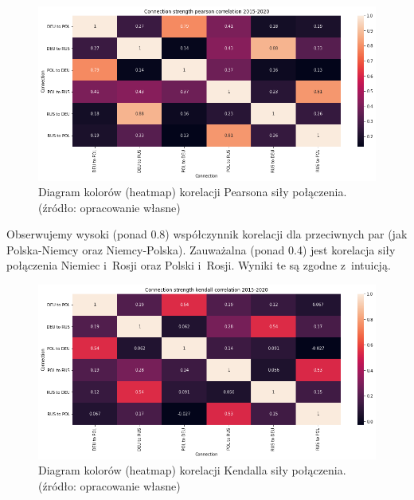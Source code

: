\documentclass[11pt]{report}
\begin{document}
    \begin{figure}[!ht]
        \centering
        \includegraphics[width=\linewidth]{../spade_proto/figures/correlation/Connection strength pearson correlation 2015-2020.png}
        \caption{Diagram kolorów (heatmap) korelacji Pearsona siły połączenia. (źródło: opracowanie własne)}
        \label{fig:Connection strength pearson correlation 2015-2020}
    \end{figure}

    Obserwujemy wysoki (ponad 0.8) współczynnik korelacji dla przeciwnych par (jak Polska-Niemcy oraz Niemcy-Polska).
    Zauważalna (ponad 0.4) jest korelacja siły połączenia Niemiec i~Rosji oraz Polski i~Rosji.
    Wyniki te są zgodne z~intuicją.

    \begin{figure}[!ht]
        \centering
        \includegraphics[width=\linewidth]{../spade_proto/figures/correlation/Connection strength kendall correlation 2015-2020.png}
        \caption{Diagram kolorów (heatmap) korelacji Kendalla siły połączenia. (źródło: opracowanie własne)}
        \label{fig:Connection strength kendall correlation 2015-2020}
    \end{figure}
\end{document}
